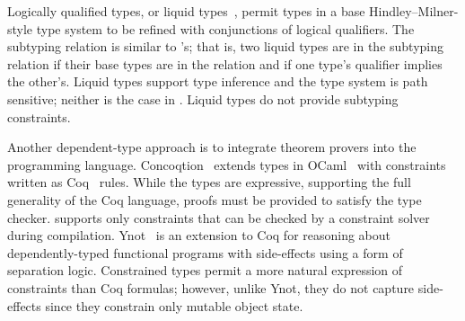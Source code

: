 




Logically qualified types, or liquid types~\cite{liquid-types},
permit types in a base Hindley--Milner-style type system to be refined with
conjunctions of logical qualifiers.  The subtyping relation is similar to
\Xten{}'s; that is, two liquid types are in the subtyping relation if their base
types are in the relation and if one type's qualifier implies the other's.
Liquid types support type inference and 
the type system is path sensitive; neither is the case in \Xten.
Liquid types do not provide subtyping constraints.


Another dependent-type approach is to integrate theorem 
provers into the programming language.
Concoqtion~\cite{concoqtion} extends types in OCaml~\cite{ocaml}
with constraints written as Coq~\cite{coq} rules.
While the types are expressive, supporting the full generality
of the Coq language, proofs must be
provided to satisfy the type checker.
\Xten{} supports only constraints that can be checked by a
constraint solver during compilation.
Ynot~\cite{ynot} is an extension to Coq for reasoning about 
dependently-typed functional programs with side-effects using a
form of separation logic.
Constrained types permit a more natural expression of constraints
than Coq formulas; however, unlike Ynot, they do not capture
side-effects since they constrain
only mutable object state.


